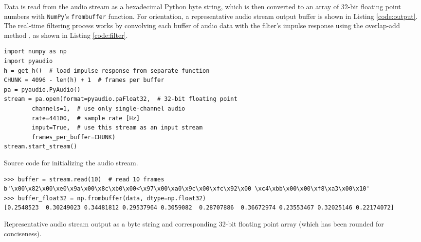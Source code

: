 Data is read from the audio stream as a hexadecimal Python byte string, which is then converted to an array of 32-bit floating point numbers with \texttt{NumPy}'s \texttt{frombuffer} function. For orientation, a representative audio stream output buffer is shown in Listing \ref{code:output}. The real-time filtering process works by convolving each buffer of audio data with the filter's impulse response using the overlap-add method \cite{convolution}, as shown in Listing \ref{code:filter}.

\begin{listing}[htb!]
\begin{verbatim}
import numpy as np
import pyaudio
h = get_h()  # load impulse response from separate function
CHUNK = 4096 - len(h) + 1  # frames per buffer
pa = pyaudio.PyAudio()
stream = pa.open(format=pyaudio.paFloat32,  # 32-bit floating point
        channels=1,  # use only single-channel audio
        rate=44100,  # sample rate [Hz]
        input=True,  # use this stream as an input stream
        frames_per_buffer=CHUNK)
stream.start_stream()
\end{verbatim}
    \vspace{-1ex}
    \caption{Source code for initializing the audio stream.}
    \label{code:stream}
\end{listing}


\begin{listing}
\begin{verbatim}
>>> buffer = stream.read(10)  # read 10 frames
b'\x00\x82\x00\xe0\x9a\x00\x8c\xb0\x00<\x97\x00\xa0\x9c\x00\xfc\x92\x00 \xc4\xbb\x00\x00\xf8\xa3\x00\x10'
>>> buffer_float32 = np.frombuffer(data, dtype=np.float32)
[0.2548523  0.30249023 0.34481812 0.29537964 0.3059082  0.28707886  0.36672974 0.23553467 0.32025146 0.22174072]
\end{verbatim}   
    \vspace{-1ex}
    \caption{Representative audio stream output as a byte string and corresponding 32-bit floating point array (which has been rounded for conciseness).}
    \label{code:output}
\end{listing}

